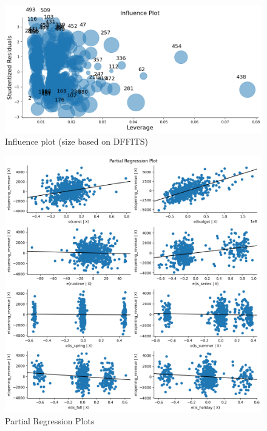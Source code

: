 \documentclass[10pt]{article}
\begin{document}
\begin{figure}[H]
	\begin{center}
		\centerline{\includegraphics[width=\columnwidth]{influence_plot}}
		\caption{Influence plot (size based on DFFITS)}
	\end{center}
\end{figure}

\begin{figure}[H]
	\begin{center}
		\centerline{\includegraphics[width=\columnwidth]{partial_regression}}
		\caption{Partial Regression Plots}
	\end{center}
\end{figure}
\end{document}
